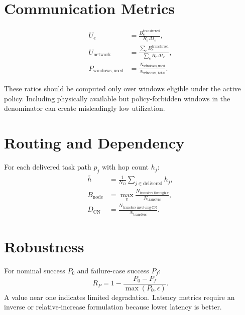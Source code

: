 \section{Communication Metrics}

\begin{align}
U_e &= \frac{B_e^{\mathrm{transferred}}}{R_e\Delta t_e},\\
U_{\mathrm{network}} &= \frac{\sum_e B_e^{\mathrm{transferred}}}
{\sum_e R_e\Delta t_e},\\
P_{\mathrm{windows,used}} &= \frac{N_{\mathrm{windows,used}}}{N_{\mathrm{windows,total}}}.
\end{align}

These ratios should be computed only over windows eligible under the active policy. Including physically available but policy-forbidden windows in the denominator can create misleadingly low utilization.

\section{Routing and Dependency}

For each delivered task path $p_j$ with hop count $h_j$:
\begin{align}
\bar{h} &= \frac{1}{N_D}\sum_{j\in\mathrm{delivered}} h_j,\\
B_{\mathrm{node}} &= \max_v \frac{N_{\mathrm{transfers\ through\ }v}}{N_{\mathrm{transfers}}},\\
D_{\mathrm{CN}} &= \frac{N_{\mathrm{transfers\ involving\ CN}}}{N_{\mathrm{transfers}}}.
\end{align}

\section{Robustness}

For nominal success $P_0$ and failure-case success $P_f$:
\begin{equation}
R_P = 1-\frac{P_0-P_f}{\max(P_0,\epsilon)}.
\end{equation}
A value near one indicates limited degradation. Latency metrics require an inverse or relative-increase formulation because lower latency is better.

